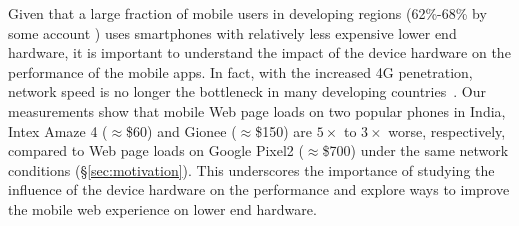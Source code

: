 Given that a large fraction of mobile
users in developing regions (62\%-68\% by some 
account \cite{unity}) uses smartphones with relatively
less expensive lower end hardware, it is important
to understand the impact of the device hardware on the 
performance of the mobile apps. In fact, with the increased 4G penetration, network speed is no longer the bottleneck in many developing countries~\cite{mobilephones,contreras2017patents,jioplans1,jioplans2}.  Our measurements show that mobile Web page loads on two popular phones in India, Intex Amaze 4 ($\approx$\$60) and Gionee ($\approx$\$150) are $5\times$ to $3\times$ worse, respectively, compared to Web page loads on Google Pixel2 ($\approx$\$700) under the same network conditions (\S\ref{sec:motivation}). 
This underscores the importance of studying the influence of the device hardware
on the performance and explore ways to improve the mobile web experience on lower end hardware. 

